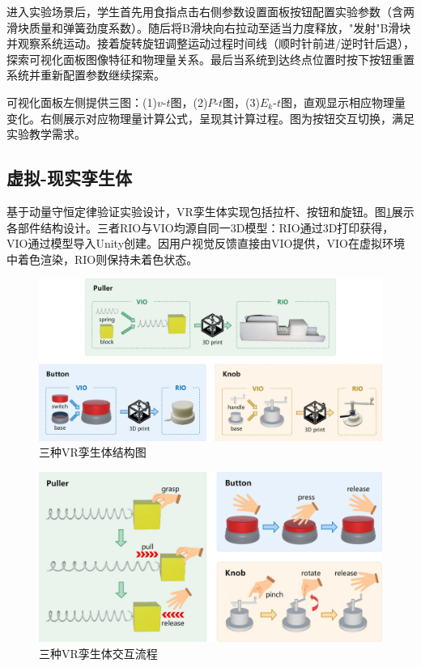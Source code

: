 \documentclass[runningheads]{llncs}
\begin{document}
进入实验场景后，学生首先用食指点击右侧参数设置面板按钮配置实验参数（含两滑块质量和弹簧劲度系数）。随后将B滑块向右拉动至适当力度释放，"发射"B滑块并观察系统运动。接着旋转旋钮调整运动过程时间线（顺时针前进/逆时针后退），探索可视化面板图像特征和物理量关系。最后当系统到达终点位置时按下按钮重置系统并重新配置参数继续探索。

可视化面板左侧提供三图：(1)$v$-$t$图，(2)$P$-$t$图，(3)$E_k$-$t$图，直观显示相应物理量变化。右侧展示对应物理量计算公式，呈现其计算过程。图为按钮交互切换，满足实验教学需求。

\subsection{虚拟-现实孪生体}
基于动量守恒定律验证实验设计，VR孪生体实现包括拉杆、按钮和旋钮。图\ref{fig:structural-diagram}展示各部件结构设计。三者RIO与VIO均源自同一3D模型：RIO通过3D打印获得，VIO通过模型导入Unity创建。因用户视觉反馈直接由VIO提供，VIO在虚拟环境中着色渲染，RIO则保持未着色状态。

\begin{figure}[t]
  \centering
  \includegraphics[width=1\textwidth]{image/Structural-Diagram.pdf}
  \caption{三种VR孪生体结构图}
  \label{fig:structural-diagram}
\end{figure}

\begin{figure}[t]
  \centering
  \includegraphics[width=1\textwidth]{image/Interaction-Flow.pdf}
  \caption{三种VR孪生体交互流程}
  \label{fig:interaction-flow}
\end{figure}
\end{document}
